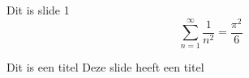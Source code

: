 \documentclass{beamer}
\begin{document}
\begin{frame}
    Dit is slide 1
    \[ \sum_{n=1}^\infty \frac{1}{n^2} = \frac{\pi^2}{6} \]
\end{frame}
\begin{frame}{Dit is een titel}
    Deze slide heeft een titel
\end{frame}
\end{document}
